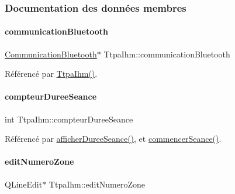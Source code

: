 \subsubsection{Documentation des données membres}
\mbox{\label{class_ttpa_ihm_a477c64fe999f4dec468fca9b04c5d842}} 
\paragraph{\texorpdfstring{communication\+Bluetooth}{communicationBluetooth}}
{\footnotesize\ttfamily \hyperlink{class_communication_bluetooth}{Communication\+Bluetooth}$\ast$ Ttpa\+Ihm\+::communication\+Bluetooth\hspace{0.3cm}{\ttfamily [private]}}



Référencé par \hyperlink{class_ttpa_ihm_ab3ed4b37a93ff04842414d4a98861d66}{Ttpa\+Ihm()}.

\mbox{\label{class_ttpa_ihm_abb5ab7cc023685e40cb278f0210f276f}} 
\paragraph{\texorpdfstring{compteur\+Duree\+Seance}{compteurDureeSeance}}
{\footnotesize\ttfamily int Ttpa\+Ihm\+::compteur\+Duree\+Seance\hspace{0.3cm}{\ttfamily [private]}}



Référencé par \hyperlink{class_ttpa_ihm_a266897eb263e584b40fc2b7c26347623}{afficher\+Duree\+Seance()}, et \hyperlink{class_ttpa_ihm_a9bf7a4cddbdbf786d781e4d084409068}{commencer\+Seance()}.

\mbox{\label{class_ttpa_ihm_a843f5742ec2289d08e2be94dda2c9128}} 
\paragraph{\texorpdfstring{edit\+Numero\+Zone}{editNumeroZone}}
{\footnotesize\ttfamily Q\+Line\+Edit$\ast$ Ttpa\+Ihm\+::edit\+Numero\+Zone\hspace{0.3cm}{\ttfamily [private]}}



